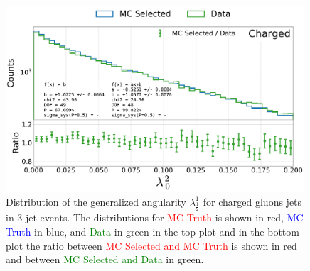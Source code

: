 \begin{figure}[h!]
  \centerfloat
  \includegraphics[width=0.99\textwidth, trim=0 0 0 0, clip, page=2]{figures/quarks/generalized_angularities_cha-down_sample=1.00-ML_vars=vertex-selection=b-ejet_min=4-n_iter_RS_lgb=99-n_iter_RS_xgb=9-cdot_cut=0.90-version=19.pdf}
  \caption[Generalized Angularities for Charged Gluons Jets: $\lambda_{1/2}^1$]
          {Distribution of the generalized angularity $\lambda_{\frac{1}{2}}^1$ for charged gluons jets in 3-jet events. The distributions for \textcolor{red}{MC Truth} is shown in red, \textcolor{blue}{MC Truth} in blue, and \textcolor{green}{Data} in green in the top plot and in the bottom plot the ratio between \textcolor{red}{MC Selected and MC Truth} is shown in red and between \textcolor{green}{MC Selected and Data} in green. }
  \label{fig:q:generalized_angularities_cha_lambda_5_1}
\end{figure}
